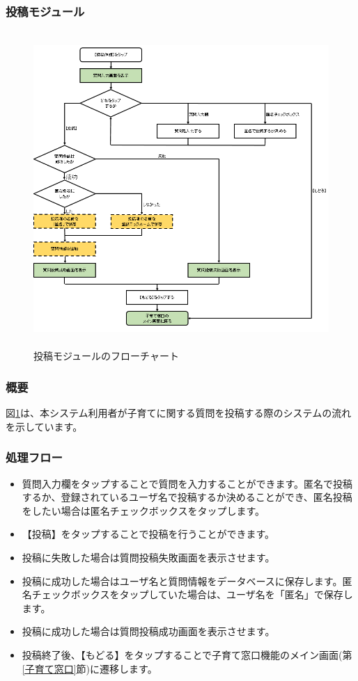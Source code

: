 \documentclass[a4j]{jarticle}
\begin{document}
\subsubsection{投稿モジュール\label{投稿}} %
\begin{figure}[H]
    \begin{center}
      \includegraphics[height = 12.0cm] {子育て窓口_投稿.png} %
    \caption {投稿モジュールのフローチャート}
    \label{子育て窓口_投稿}
    \end{center}
\end{figure}
\subsubsection*{概要}
図\ref{子育て窓口_投稿}は、本システム利用者が子育てに関する質問を投稿する際のシステムの流れを示しています。
\subsubsection*{処理フロー}
\begin{itemize}
\item 質問入力欄をタップすることで質問を入力することができます。匿名で投稿するか、登録されているユーザ名で投稿するか決めることができ、匿名投稿をしたい場合は匿名チェックボックスをタップします。
\item 【投稿】をタップすることで投稿を行うことができます。
\item 投稿に失敗した場合は質問投稿失敗画面を表示させます。
\item 投稿に成功した場合はユーザ名と質問情報をデータベースに保存します。匿名チェックボックスをタップしていた場合は、ユーザ名を「匿名」で保存します。
\item 投稿に成功した場合は質問投稿成功画面を表示させます。
\item 投稿終了後、【もどる】をタップすることで子育て窓口機能のメイン画面(第\ref{子育て窓口}節)に遷移します。

\end{itemize}
\end{document}
